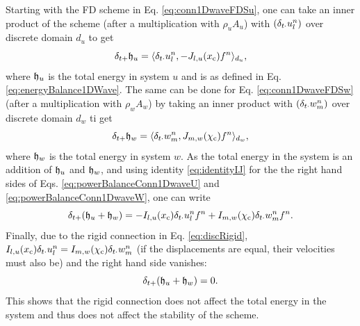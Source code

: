 Starting with the FD scheme in Eq. \eqref{eq:conn1DwaveFDSu}, one can take an inner product of the scheme (after a multiplication with $\rho_u A_u$) with $(\delta_{t\cdot}u_l^n)$ over discrete domain $d_u$ to get
\begin{equation}\label{eq:powerBalanceConn1DwaveU}
    \delta_{t+} \mathfrak{h}_u = \langle \delta_{t\cdot}u_l^n, -J_{l, u}(x_{\text{c}}) f^n\rangle_{d_u},
\end{equation}
where $\mathfrak{h}_u$ is the total energy in system $u$ and is as defined in Eq. \eqref{eq:energyBalance1DWave}. The same can be done for Eq. \eqref{eq:conn1DwaveFDSw} (after a multiplication with $\rho_w A_w$) by taking an inner product with $(\delta_{t\cdot}w_m^n)$ over discrete domain $d_w$ ti get 
\begin{equation}\label{eq:powerBalanceConn1DwaveW}
    \delta_{t+} \mathfrak{h}_w = \langle \delta_{t\cdot}w_m^n, J_{m, w}(\chi_{\text{c}}) f^n\rangle_{d_w},
\end{equation}
where $\mathfrak{h}_w$ is the total energy in system $w$. As the total energy in the system is an addition of $\mathfrak{h}_u$ and $\mathfrak{h}_w$, and using identity \eqref{eq:identityIJ} for the the right hand sides of Eqs. \eqref{eq:powerBalanceConn1DwaveU} and \eqref{eq:powerBalanceConn1DwaveW}, one can write 
\begin{equation}\label{eq:rOCconnSystem}
    \delta_{t+} (\mathfrak{h}_u + \mathfrak{h}_w) = -I_{l, u}(x_{\text{c}}) \delta_{t\cdot} u_l^n f^n + I_{m, w}(\chi_{\text{c}}) \delta_{t\cdot} w_m^n f^n.
\end{equation}
Finally, due to the rigid connection in Eq. \eqref{eq:discRigid}, $I_{l, u}(x_{\text{c}}) \delta_{t\cdot} u_l^n = I_{m, w}(\chi_{\text{c}}) \delta_{t\cdot} w_m^n$ (if the displacements are equal, their velocities must also be) and the right hand side vanishes:
\begin{equation*}
    \delta_{t+} (\mathfrak{h}_u + \mathfrak{h}_w) = 0.
\end{equation*}
This shows that the rigid connection does not affect the total energy in the system and thus does not affect the stability of the scheme.

